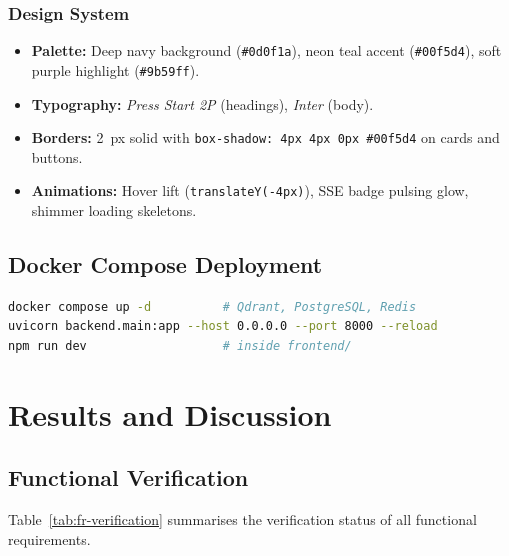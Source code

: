 \documentclass[12pt,a4paper,oneside]{report}
\begin{document}
\subsection{Design System}
\begin{itemize}[leftmargin=*]
  \item \textbf{Palette:} Deep navy background (\texttt{\#0d0f1a}),
        neon teal accent (\texttt{\#00f5d4}), soft purple highlight
        (\texttt{\#9b59ff}).
  \item \textbf{Typography:} \textit{Press Start 2P} (headings),
        \textit{Inter} (body).
  \item \textbf{Borders:} 2~px solid with \texttt{box-shadow: 4px 4px 0px
        \#00f5d4} on cards and buttons.
  \item \textbf{Animations:} Hover lift (\texttt{translateY(-4px)}),
        SSE badge pulsing glow, shimmer loading skeletons.
\end{itemize}

\section{Docker Compose Deployment}
\begin{lstlisting}[language=bash, caption={One-command service startup}]
docker compose up -d          # Qdrant, PostgreSQL, Redis
uvicorn backend.main:app --host 0.0.0.0 --port 8000 --reload
npm run dev                   # inside frontend/
\end{lstlisting}

\chapter{Results and Discussion}

\section{Functional Verification}

Table~\ref{tab:fr-verification} summarises the verification status of
all functional requirements.
\end{document}
